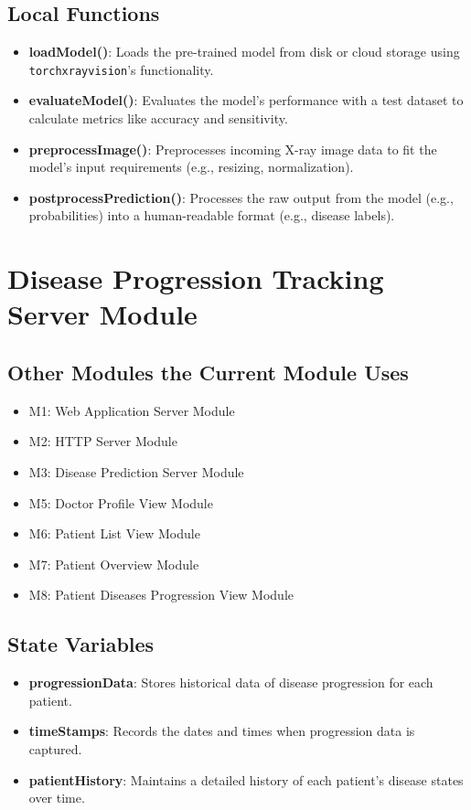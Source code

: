 \documentclass[12pt, titlepage]{article}
\begin{document}
\subsection{Local Functions}
\begin{itemize}
    \item \textbf{loadModel()}: Loads the pre-trained model from disk or cloud storage using \texttt{torchxrayvision}'s functionality.
    \item \textbf{evaluateModel()}: Evaluates the model’s performance with a test dataset to calculate metrics like accuracy and sensitivity.
    \item \textbf{preprocessImage()}: Preprocesses incoming X-ray image data to fit the model's input requirements (e.g., resizing, normalization).
    \item \textbf{postprocessPrediction()}: Processes the raw output from the model (e.g., probabilities) into a human-readable format (e.g., disease labels).
\end{itemize}

\section{Disease Progression Tracking Server Module}

\subsection{Other Modules the Current Module Uses}
\begin{itemize}
\item M1: Web Application Server Module
\item M2: HTTP Server Module
\item M3: Disease Prediction Server Module
\item M5: Doctor Profile View Module
\item M6: Patient List View Module
\item M7: Patient Overview Module
\item M8: Patient Diseases Progression View Module
\end{itemize}

\subsection{State Variables}
\begin{itemize}
    \item \textbf{progressionData}: Stores historical data of disease progression for each patient.
    \item \textbf{timeStamps}: Records the dates and times when progression data is captured.
    \item \textbf{patientHistory}: Maintains a detailed history of each patient's disease states over time.
\end{itemize}
\end{document}
